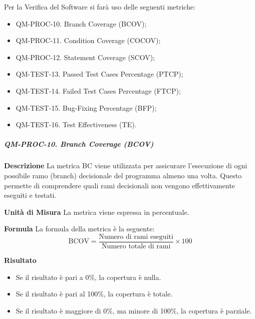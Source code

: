                         Per la Verifica del Software si farà uso delle seguenti metriche:

                        \begin{itemize}

                            \item QM-PROC-10. Branch Coverage (BCOV);
                            \item QM-PROC-11. Condition Coverage (COCOV);
                            \item QM-PROC-12. Statement Coverage (SCOV);
                            \item QM-TEST-13. Passed Test Cases Percentage (PTCP);
                            \item QM-TEST-14. Failed Test Cases Percentage (FTCP);
                            \item QM-TEST-15. Bug-Fixing Percentage (BFP);
                            \item QM-TEST-16. Test Effectiveness (TE).
                        \end{itemize}

                    \subparagraph{QM-PROC-10. Branch Coverage (BCOV)}

                        \textbf{Descrizione}
                            La metrica BC viene utilizzata per assicurare l'esecuzione di ogni possibile ramo (branch) decisionale del programma almeno una volta. Questo permette di comprendere quali rami decisionali non vengono effettivamente eseguiti e testati.

                        \textbf{Unità di Misura}
                        La metrica viene espressa in percentuale.

                        \textbf{Formula}
                            La formula della metrica è la seguente:
                            \[
                                \text{BCOV} = \frac{\text{Numero di rami eseguiti}}{\text{Numero totale di rami}} \times 100
                            \]

                        \textbf{Risultato}
                        \begin{itemize}
                            \item Se il risultato è pari a 0\%, la copertura è nulla.
                            \item Se il risultato è pari al 100\%, la copertura è totale.
                            \item Se il risultato è maggiore di 0\%, ma minore di 100\%, la copertura è parziale.
                        \end{itemize}

